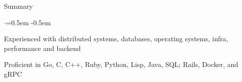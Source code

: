 \documentclass{resume} %
\begin{document}

\begin{rSection}{Summary}
  \vspace {0.2em}
  \begin{list}{$\cdot$}{\leftmargin=0.5em}
    \itemsep -0.5em \vspace{-0.3em}
    \item Experienced with distributed systems, databases, operating systems,
      infra, performance and backend
    \item Proficient in Go, C, C++, Ruby, Python, Lisp, Java, SQL; Rails, Docker,
      and gRPC
  \end{list}
  \vspace{0.1em}
\end{rSection}

\end{document}
